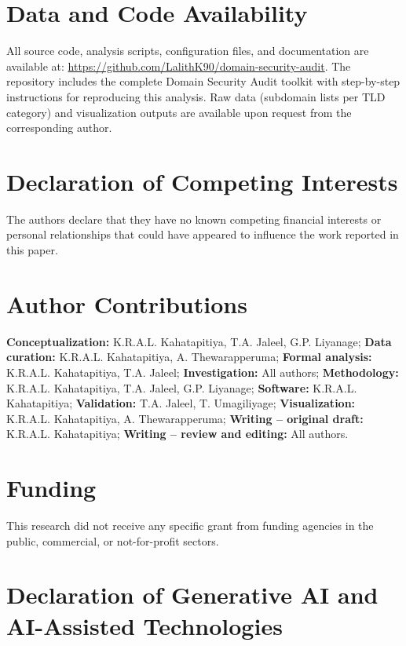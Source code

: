\documentclass[preprint,review,12pt]{elsarticle}
\begin{document}
\section*{Data and Code Availability}

All source code, analysis scripts, configuration files, and documentation are available at: \url{https://github.com/LalithK90/domain-security-audit}. The repository includes the complete Domain Security Audit toolkit with step-by-step instructions for reproducing this analysis. Raw data (subdomain lists per TLD category) and visualization outputs are available upon request from the corresponding author.

\section*{Declaration of Competing Interests}

The authors declare that they have no known competing financial interests or personal relationships that could have appeared to influence the work reported in this paper.

\section*{Author Contributions}

\textbf{Conceptualization:} K.R.A.L. Kahatapitiya, T.A. Jaleel, G.P. Liyanage; \textbf{Data curation:} K.R.A.L. Kahatapitiya, A. Thewarapperuma; \textbf{Formal analysis:} K.R.A.L. Kahatapitiya, T.A. Jaleel; \textbf{Investigation:} All authors; \textbf{Methodology:} K.R.A.L. Kahatapitiya, T.A. Jaleel, G.P. Liyanage; \textbf{Software:} K.R.A.L. Kahatapitiya; \textbf{Validation:} T.A. Jaleel, T. Umagiliyage; \textbf{Visualization:} K.R.A.L. Kahatapitiya, A. Thewarapperuma; \textbf{Writing – original draft:} K.R.A.L. Kahatapitiya; \textbf{Writing – review and editing:} All authors.

\section*{Funding}

This research did not receive any specific grant from funding agencies in the public, commercial, or not-for-profit sectors.

\section*{Declaration of Generative AI and AI-Assisted Technologies}
\end{document}
